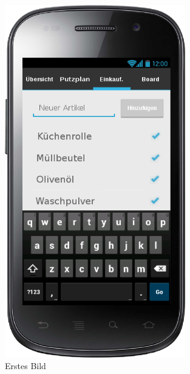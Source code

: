 \begin{figure}[htbp] 
  \centering
     \includegraphics[width=0.7\textwidth]{anhang/mockups/einkaufslisteneuerartikel.png}
  \caption{Erstes Bild}
  \label{fig:Bild1}
\end{figure}

